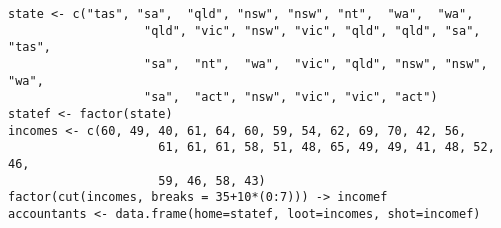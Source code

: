 
\begin{verbatim}
state <- c("tas", "sa",  "qld", "nsw", "nsw", "nt",  "wa",  "wa",
                   "qld", "vic", "nsw", "vic", "qld", "qld", "sa",  "tas",
                   "sa",  "nt",  "wa",  "vic", "qld", "nsw", "nsw", "wa",
                   "sa",  "act", "nsw", "vic", "vic", "act")
statef <- factor(state)
incomes <- c(60, 49, 40, 61, 64, 60, 59, 54, 62, 69, 70, 42, 56,
                     61, 61, 61, 58, 51, 48, 65, 49, 49, 41, 48, 52, 46,
                     59, 46, 58, 43)
factor(cut(incomes, breaks = 35+10*(0:7))) -> incomef
accountants <- data.frame(home=statef, loot=incomes, shot=incomef) 
\end{verbatim}
